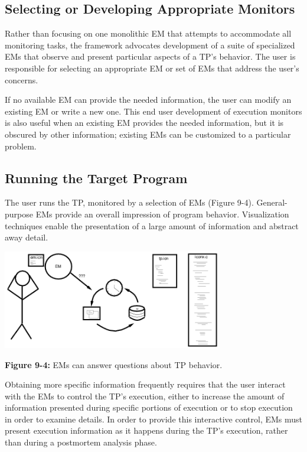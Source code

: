 \subsection*{Selecting or Developing Appropriate Monitors}

Rather than focusing on one monolithic EM that attempts to accommodate
all monitoring tasks, the framework advocates development of a suite
of specialized EMs that observe and present particular aspects of a
TP's behavior.  The user is responsible for selecting an appropriate
EM or set of EMs that address the user's
concerns.

If no available EM can provide the needed information,
the user can modify an existing EM or write a new one.  This end user
development of execution monitors is also useful when an existing EM
provides the needed information, but it is obscured by other
information; existing EMs can be customized to a particular problem.

\subsection*{Running the Target Program}

The user runs the TP, monitored by a selection of
EMs (Figure 9-4). General-purpose EMs provide an overall impression
of program behavior.  Visualization techniques enable the presentation
of a large amount of information and abstract away detail.

\begin{center}
\includegraphics[height=1.7in]{scene3.png}
\end{center}

{\sffamily\bfseries Figure 9-4:}
{\sffamily EMs can answer questions about TP behavior.}

\bigskip

Obtaining more specific information frequently requires that the user
interact with the EMs to control the TP's execution, either to increase
the amount of information presented during specific portions of
execution or to stop execution in order to examine details.
In order to provide this interactive control, EMs must present
execution information as it happens during the TP's execution, rather
than during a postmortem analysis phase.

